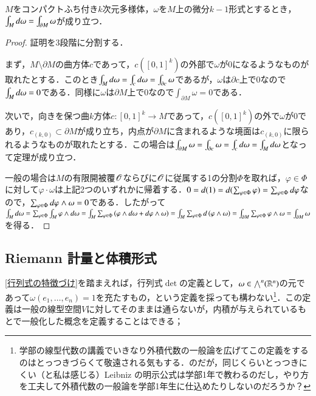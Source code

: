 \begin{thm}[Stokes]
$M$をコンパクトふち付き$k$次元多様体，$\omega$を$M$上の微分$k-1$形式とするとき，$\int_M \mathop{}\!d \omega = \int_{\partial M} \omega$が成り立つ．
\end{thm}

\begin{proof}
証明を3段階に分割する．

まず，$M \setminus \partial M$の曲方体$c$であって，$c([0,1]^k)$の外部で$\omega$が0になるようなものが取れたとする．このとき$\int_{M} \mathop{}\!d \omega = \int_{c} \mathop{}\!d \omega = \int_{\partial c} \omega$であるが，$\omega$は$\partial c$上で0なので$\int_{M} \mathop{}\!d \omega = 0$である．同様に$\omega$は$\partial M$上で0なので$\int_{\partial M} \omega = 0$である．

次いで，向きを保つ曲$k$方体$c \colon [0,1]^k \to M$であって，$c([0,1]^k)$の外で$\omega$が0であり，$c_{(k,0)} \subset \partial M$が成り立ち，内点が$\partial M$に含まれるような境面は$c_{(k,0)}$に限られるようなものが取れたとする．この場合は$\int_{\partial M} \omega = \int_{\partial c} \omega = \int_{c} \mathop{}\!d \omega = \int_M \mathop{}\!d \omega$となって定理が成り立つ．

一般の場合は$M$の有限開被覆$\mathscr{O}$ならびに$\mathscr{O}$に従属する1の分割$\Phi$を取れば，$\varphi \in \Phi$に対して$\varphi \cdot \omega$は上記2つのいずれかに帰着する．$0 = \mathop{}\!d (1) = \mathop{}\!d(\sum_{\varphi \in \Phi} \varphi) = \sum_{\varphi \in \Phi} \mathop{}\!d \varphi$なので，$\sum_{\varphi \in \Phi} \mathop{}\!d \varphi \wedge \omega = 0$である．したがって$\int_M \mathop{}\!d \omega = \sum_{\varphi \in \Phi} \int_M \varphi \wedge \mathop{}\!d \omega =  \int_M \sum_{\varphi \in \Phi} \left( \varphi \wedge \mathop{}\!d \omega + \mathop{}\!d \varphi \wedge \omega \right) = \int_M \sum_{\varphi \in \Phi} \mathop{}\!d \left( \varphi \wedge \omega \right) = \int_{\partial M} \sum_{\varphi \in \Phi} \varphi \wedge \omega = \int_{\partial M} \omega$を得る．
\end{proof}

\subsection{Riemann 計量と体積形式}

\cref{行列式の特徴づけ}を踏まえれば，行列式$\det$の定義として，$\omega \in \bigwedge^n(\mathbb{R}^n)$の元であって$\omega(e_1, \dots, e_n) = 1$を充たすもの，という定義を採っても構わない\footnote{学部の線型代数の講義でいきなり外積代数の一般論を広げてこの定義をするのはとっつきづらくて敬遠される気もする．のだが，同じくらいとっつきにくい（と私は感じる）Leibniz の明示公式は学部1年で教わるのだし，やり方を工夫して外積代数の一般論を学部1年生に仕込めたりしないのだろうか？}．この定義は一般の線型空間$V$に対してそのままは通らないが，内積が与えられているもとで一般化した概念を定義することはできる；

